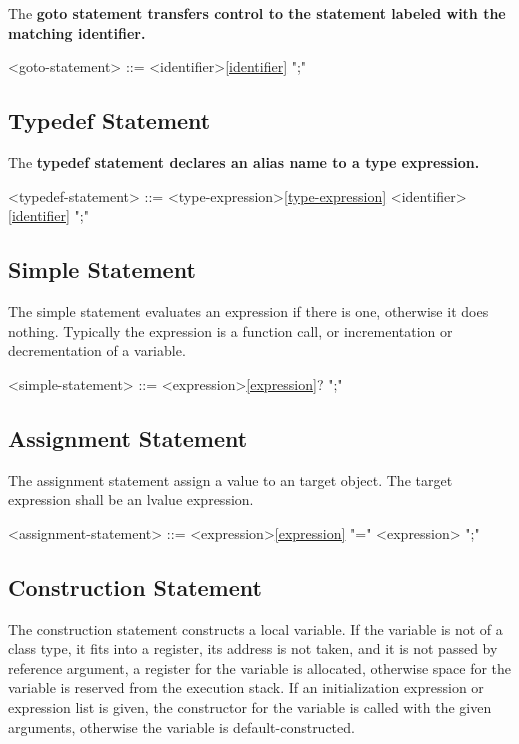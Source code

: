 \documentclass[a4paper,oneside,11pt]{article}
\begin{document}
The \bf{goto} statement transfers control to the statement labeled with the matching identifier.

\begin{grammar}
\label{goto-statement}<goto-statement> ::=  <identifier>\ref{identifier} ";"
\end{grammar}

\subsection{Typedef Statement}

The \bf{typedef} statement declares an alias name to a type expression.

\begin{grammar}
\label{typedef-statement}<typedef-statement> ::=  <type-expression>\ref{type-expression} <identifier>\ref{identifier} ";"
\end{grammar}

\subsection{Simple Statement}

The simple statement evaluates an expression if there is one, otherwise it does nothing.
Typically the expression is a function call, or incrementation or decrementation of a variable.

\begin{grammar}
\label{simple-statement}<simple-statement> ::= <expression>\ref{expression}? ";"
\end{grammar}

\subsection{Assignment Statement}

The assignment statement assign a value to an target object. The target expression shall be an lvalue expression.

\begin{grammar}
\label{assignment-statement}<assignment-statement> ::= <expression>\ref{expression} "=" <expression> ";"
\end{grammar}

\subsection{Construction Statement}

The construction statement constructs a local variable.
If the variable is not of a class type, it fits into a register, its address is not taken,
and it is not passed by reference argument, a register for the variable is allocated,
otherwise space for the variable is reserved from the execution stack.
If an initialization expression or expression list is given, the constructor for the variable is called with the given arguments,
otherwise the variable is default-constructed.
\end{document}
